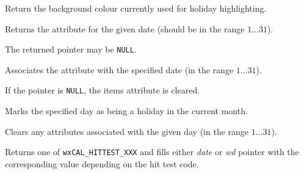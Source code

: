 
Return the background colour currently used for holiday highlighting.



\label{wxcalendarctrlgetattr}


Returns the attribute for the given date (should be in the range $1\ldots31$).

The returned pointer may be {\tt NULL}.

\label{wxcalendarctrlsetattr}


Associates the attribute with the specified date (in the range $1\ldots31$).

If the pointer is {\tt NULL}, the items attribute is cleared.

\label{wxcalendarctrlsetholiday}


Marks the specified day as being a holiday in the current month.

\label{wxcalendarctrlresetattr}


Clears any attributes associated with the given day (in the range
$1\ldots31$).

\label{wxcalendarctrlhittest}


Returns one of {\tt wxCAL\_HITTEST\_XXX} 
 and fills either {\it date} or 
{\it wd} pointer with the corresponding value depending on the hit test code.

\section{}\label{wxcalendardateattr}

